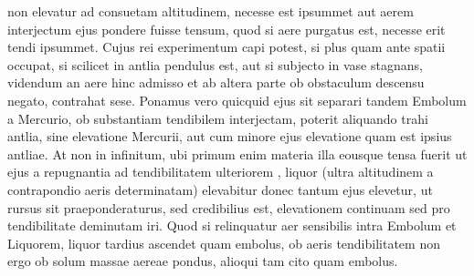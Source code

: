 non elevatur ad consuetam altitudinem, necesse est ipsummet aut aerem interjectum  ejus pondere fuisse tensum, quod si aere purgatus est, necesse  erit tendi ipsummet. Cujus rei experimentum capi potest, si  plus quam ante spatii occupat, si scilicet in antlia\protect{} pendulus est, aut si subjecto in vase  stagnans, videndum an aere hinc  admisso et ab altera parte ob  obstaculum descensu negato,  contrahat sese. Ponamus  vero quicquid ejus sit  separari tandem Embolum\protect{} a Mercurio\protect{}, ob substantiam tendibilem interjectam,  poterit aliquando trahi antlia\protect{}, sine elevatione Mercurii\protect{}, aut cum minore ejus elevatione quam  est ipsius antliae\protect{}.                      At non in infinitum, ubi  primum enim materia\protect{}  illa eousque tensa  fuerit ut ejus a repugnantia ad tendibilitatem ulteriorem , liquor (ultra altitudinem a  contrapondio aeris determinatam) elevabitur  donec tantum ejus elevetur, ut rursus  sit praeponderaturus, sed credibilius  est, elevationem continuam sed pro tendibilitate  deminutam iri. Quod si relinquatur aer  sensibilis intra Embolum\protect{} et Liquorem, liquor tardius  ascendet quam embolus\protect{}, ob aeris tendibilitatem  non ergo ob solum massae\protect{} aereae pondus, alioqui tam  cito quam embolus.\pend
